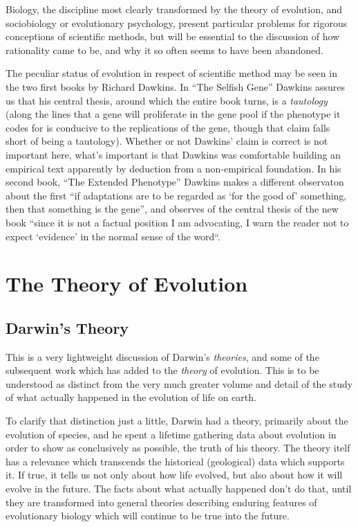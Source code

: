 \documentclass[10pt,titlepage]{article}
\begin{document}
Biology, the discipline most clearly transformed by the theory of evolution, and sociobiology or 
evolutionary psychology, present particular problems for rigorous conceptions of scientific methods, but will be essential to the discussion of how rationality came to be, and why it so often seems to have been abandoned.

The peculiar status of evolution in respect of scientific method may be seen in the two first books by Richard Dawkins.
In ``The Selfish Gene''\cite{dawkinsSG} Dawkins assures us that his central thesis, around which the entire book turns, is a \emph{tautology} (along the lines that a gene will proliferate in the gene pool if the phenotype it codes for is conducive to the replications of the gene, though that claim falls short of being a tautology).
Whether or not Dawkins' claim is correct is not important here, what's important is that Dawkins was comfortable building an empirical text apparently by deduction from a non-empirical foundation.
In his second book, ``The Extended Phenotype''\cite{dawkinsEP} Dawkins makes a different observaton about the first ``if adaptations are to be regarded as `for the good of' something, then that something is the gene'', and observes of the central thesis of the new book ``since it is not a factual position I am advocating, I warn the reader not to expect `evidence' in the normal sense of the word``.


\section{The Theory of Evolution}

\subsection{Darwin's Theory}

This is a very lightweight discussion of Darwin's \emph{theories}, and some of the subsequent work which has added to the \emph{theory} of evolution.
This is to be understood as distinct from the very much greater volume and detail of the study of what actually happened in the evolution of life on earth.

To clarify that distinction just a little, Darwin had a theory, primarily about the evolution of species, and he spent a lifetime gathering data about evolution in order to show as conclusively as possible, the truth of his theory.
The theory itelf has a relevance which transcends the historical (geological) data which supports it.
If true, it tells us not only about how life evolved, but also about how it will evolve in the future.
The facts about what actually happened don't do that, until they are transformed into general theories describing enduring features of evolutionary biology which will continue to be true into the future.
\end{document}
